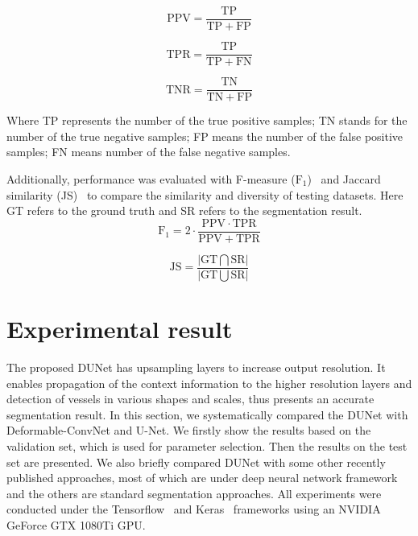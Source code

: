 \documentclass[journal]{IEEEtran}
\begin{document}
\setlength{\abovedisplayshortskip}{0pt}
\setlength{\belowdisplayshortskip}{0pt}
\begin{equation}
\mathrm{PPV}=\frac{\mathrm{TP}}{\mathrm{TP}+\mathrm{FP}}
\label{eq:PPV}
\end{equation}

\setlength{\abovedisplayshortskip}{0pt}
\setlength{\belowdisplayshortskip}{0pt}
\begin{equation}
\mathrm{TPR}=\frac{\mathrm{TP}}{\mathrm{TP}+\mathrm{FN}}
\label{eq:TPR}
\end{equation}

\setlength{\abovedisplayshortskip}{0pt}
\setlength{\belowdisplayshortskip}{0pt}
\begin{equation}
\mathrm{TNR}=\frac{\mathrm{TN}}{\mathrm{TN}+\mathrm{FP}}
\label{eq:SPC}
\end{equation}


Where TP represents the number of the true positive samples; TN stands for the number of the true negative samples; FP means the number of the false positive samples; FN means number of the false negative samples.

Additionally, performance was evaluated with F-measure ($\mathrm{F_{1}}$)~\cite{sasaki_truth_2007} and Jaccard similarity (JS)~\cite{jaccard_distribution_1901} to compare the similarity and diversity of testing datasets. Here GT refers to the ground truth and SR refers to the segmentation result.
\setlength{\abovedisplayshortskip}{0pt}
\setlength{\belowdisplayshortskip}{0pt}
\begin{equation}
\mathrm{F_{1}}=2\cdot \frac{\mathrm{PPV}\cdot \mathrm{TPR}}{\mathrm{PPV}+\mathrm{TPR}}
\label{eq:f_measure}
\end{equation}

\setlength{\abovedisplayshortskip}{0pt}
\setlength{\belowdisplayshortskip}{0pt}
\begin{equation}
\mathrm{JS}=\frac{\left | \mathrm{GT}\bigcap \mathrm{SR }\right |}{\left |\mathrm{GT}\bigcup \mathrm{SR}\right |}
\label{eq:jaccard}
\end{equation}

\section{Experimental result}
\label{sec:experimental}
The proposed DUNet has upsampling layers to increase output resolution. It enables propagation of the context information to the higher resolution layers and detection of vessels in various shapes and scales, thus presents an accurate segmentation result. In this section, we systematically compared the DUNet with Deformable-ConvNet and U-Net. We firstly show the results based on the validation set, which is used for parameter selection. Then the results on the test set are presented. We also briefly compared DUNet with some other recently published approaches, most of which are under deep neural network framework and the others are standard segmentation approaches. All experiments were conducted under the Tensorflow~\cite{abadi_tensorflow:_2016} and Keras~\cite{chollet_keras_2015} frameworks using an NVIDIA GeForce GTX 1080Ti GPU.
\end{document}

